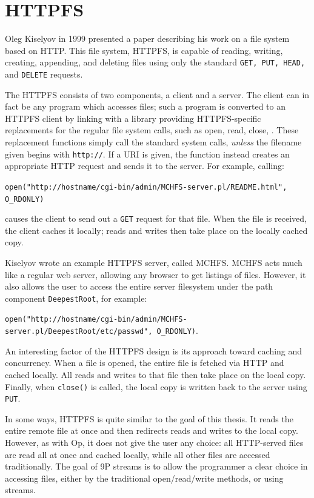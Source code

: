 \documentclass[11pt,american]{report}
\begin{document}
\section{HTTPFS}
Oleg Kiselyov in 1999 presented a paper \cite{HTTPFS} describing his work on a file system based on HTTP. This file system, HTTPFS, is capable of reading, writing, creating, appending, and deleting files using only the standard {\tt GET, PUT, HEAD,} and {\tt DELETE} requests.

The HTTPFS consists of two components, a client and a server. The client can in fact be any program which accesses files; such a program is converted to an HTTPFS client by linking with a library providing HTTPFS-specific replacements for the regular file system calls, such as open, read, close, \etc. These replacement functions simply call the standard system calls, \emph{unless} the filename given begins with {\tt http://}. If a URI is given, the function instead creates an appropriate HTTP request and sends it to the server. For example, calling:

{\scriptsize{\tt open("http://hostname/cgi-bin/admin/MCHFS-server.pl/README.html", O\_RDONLY)}} \cite{HTTPFS}

\noindent causes the client to send out a {\tt GET} request for that file. When the file is received, the client caches it locally; reads and writes then take place on the locally cached copy.

Kiselyov wrote an example HTTPFS server, called MCHFS. MCHFS acts much like a regular web server, allowing any browser to get listings of files. However, it also allows the user to access the entire server filesystem under the path component {\tt DeepestRoot}, for example: 

{\scriptsize{\tt open("http://hostname/cgi-bin/admin/MCHFS-server.pl/DeepestRoot/etc/passwd", O\_RDONLY)}}. \cite{HTTPFS}

An interesting factor of the HTTPFS design is its approach toward caching and concurrency. When a file is opened, the entire file is fetched via HTTP and cached locally. All reads and writes to that file then take place on the local copy. Finally, when {\tt close()} is called, the local copy is written back to the server using {\tt PUT}.

In some ways, HTTPFS is quite similar to the goal of this thesis. It reads the entire remote file at once and then redirects reads and writes to the local copy. However, as with Op, it does not give the user any choice: all HTTP-served files are read all at once and cached locally, while all other files are accessed traditionally. The goal of 9P streams is to allow the programmer a clear choice in accessing files, either by the traditional open/read/write methods, or using streams.
\end{document}
